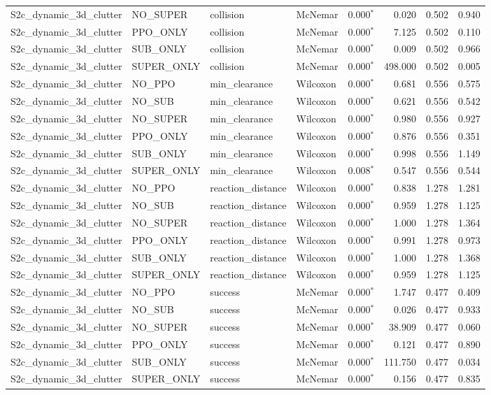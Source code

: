 \begin{tabular}{llllrrrl}
  S2c_dynamic_3d_clutter & NO_SUPER & collision & McNemar & 0.000$^{*}$ & 0.020 & 0.502 & 0.940 \\
  S2c_dynamic_3d_clutter & PPO_ONLY & collision & McNemar & 0.000$^{*}$ & 7.125 & 0.502 & 0.110 \\
  S2c_dynamic_3d_clutter & SUB_ONLY & collision & McNemar & 0.000$^{*}$ & 0.009 & 0.502 & 0.966 \\
  S2c_dynamic_3d_clutter & SUPER_ONLY & collision & McNemar & 0.000$^{*}$ & 498.000 & 0.502 & 0.005 \\
  S2c_dynamic_3d_clutter & NO_PPO & min_clearance & Wilcoxon & 0.000$^{*}$ & 0.681 & 0.556 & 0.575 \\
  S2c_dynamic_3d_clutter & NO_SUB & min_clearance & Wilcoxon & 0.000$^{*}$ & 0.621 & 0.556 & 0.542 \\
  S2c_dynamic_3d_clutter & NO_SUPER & min_clearance & Wilcoxon & 0.000$^{*}$ & 0.980 & 0.556 & 0.927 \\
  S2c_dynamic_3d_clutter & PPO_ONLY & min_clearance & Wilcoxon & 0.000$^{*}$ & 0.876 & 0.556 & 0.351 \\
  S2c_dynamic_3d_clutter & SUB_ONLY & min_clearance & Wilcoxon & 0.000$^{*}$ & 0.998 & 0.556 & 1.149 \\
  S2c_dynamic_3d_clutter & SUPER_ONLY & min_clearance & Wilcoxon & 0.008$^{*}$ & 0.547 & 0.556 & 0.544 \\
  S2c_dynamic_3d_clutter & NO_PPO & reaction_distance & Wilcoxon & 0.000$^{*}$ & 0.838 & 1.278 & 1.281 \\
  S2c_dynamic_3d_clutter & NO_SUB & reaction_distance & Wilcoxon & 0.000$^{*}$ & 0.959 & 1.278 & 1.125 \\
  S2c_dynamic_3d_clutter & NO_SUPER & reaction_distance & Wilcoxon & 0.000$^{*}$ & 1.000 & 1.278 & 1.364 \\
  S2c_dynamic_3d_clutter & PPO_ONLY & reaction_distance & Wilcoxon & 0.000$^{*}$ & 0.991 & 1.278 & 0.973 \\
  S2c_dynamic_3d_clutter & SUB_ONLY & reaction_distance & Wilcoxon & 0.000$^{*}$ & 1.000 & 1.278 & 1.368 \\
  S2c_dynamic_3d_clutter & SUPER_ONLY & reaction_distance & Wilcoxon & 0.000$^{*}$ & 0.959 & 1.278 & 1.125 \\
  S2c_dynamic_3d_clutter & NO_PPO & success & McNemar & 0.000$^{*}$ & 1.747 & 0.477 & 0.409 \\
  S2c_dynamic_3d_clutter & NO_SUB & success & McNemar & 0.000$^{*}$ & 0.026 & 0.477 & 0.933 \\
  S2c_dynamic_3d_clutter & NO_SUPER & success & McNemar & 0.000$^{*}$ & 38.909 & 0.477 & 0.060 \\
  S2c_dynamic_3d_clutter & PPO_ONLY & success & McNemar & 0.000$^{*}$ & 0.121 & 0.477 & 0.890 \\
  S2c_dynamic_3d_clutter & SUB_ONLY & success & McNemar & 0.000$^{*}$ & 111.750 & 0.477 & 0.034 \\
  S2c_dynamic_3d_clutter & SUPER_ONLY & success & McNemar & 0.000$^{*}$ & 0.156 & 0.477 & 0.835 \\
\bottomrule
\end{tabular}